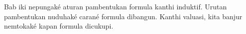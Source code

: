 \documentclass[../../../include/open-logic-chapter]{subfiles}
\begin{document}

Bab iki nepungaké aturan pambentukan formula kanthi induktif.
Urutan pambentukan nuduhaké carané formula dibangun. Kanthi
valuasi, kita banjur nemtokaké kapan formula dicukupi.







\OLEndChapterHook
\end{document}
